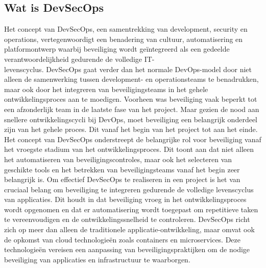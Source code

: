 \documentclass{hogent-article}
\begin{document}
    \subsection{Wat is DevSecOps}
    Het concept van DevSecOps, een samentrekking van development, security en operations, vertegenwoordigt een benadering van cultuur, automatisering en platformontwerp waarbij beveiliging wordt geïntegreerd als een gedeelde verantwoordelijkheid gedurende de volledige IT-\\levenscyclus. \autocite{redhat}
    DevSecOps gaat verder dan het normale DevOps-model door niet alleen de samenwerking tussen development- en operationsteams te benadrukken, maar ook door het integreren van beveiligingsteams in het gehele ontwikkelingsproces aan te moedigen. Voorheen was beveiliging vaak beperkt tot een afzonderlijk team in de laatste fase van het project. Maar gezien de nood aan snellere ontwikkelingscycli bij DevOps, moet beveiliging een belangrijk onderdeel zijn van het gehele proces. Dit vanaf het begin van het project tot aan het einde.
    Het concept van DevSecOps onderstreept de belangrijke rol voor beveiliging vanaf het vroegste stadium van het ontwikkelingsproces. Dit toont aan dat niet alleen het automatiseren van beveiligingscontroles, maar ook het selecteren van geschikte tools en het betrekken van beveiligingsteams vanaf het begin zeer belangrijk is.
    Om effectief DevSecOps te realiseren in een project is het van cruciaal belang om beveiliging te integreren gedurende de volledige levenscyclus van applicaties. Dit houdt in dat beveiliging vroeg in het ontwikkelingsproces wordt opgenomen en dat er automatisering wordt toegepast om repetitieve taken te vereenvoudigen en de ontwikkelingssnelheid te controleren.
    DevSecOps richt zich op meer dan alleen de traditionele applicatie-ontwikkeling, maar omvat ook de opkomst van cloud technologieën zoals containers en microservices. Deze technologieën vereisen een aanpassing van beveiligingspraktijken om de nodige beveiliging van applicaties en infrastructuur te waarborgen.
\end{document}
